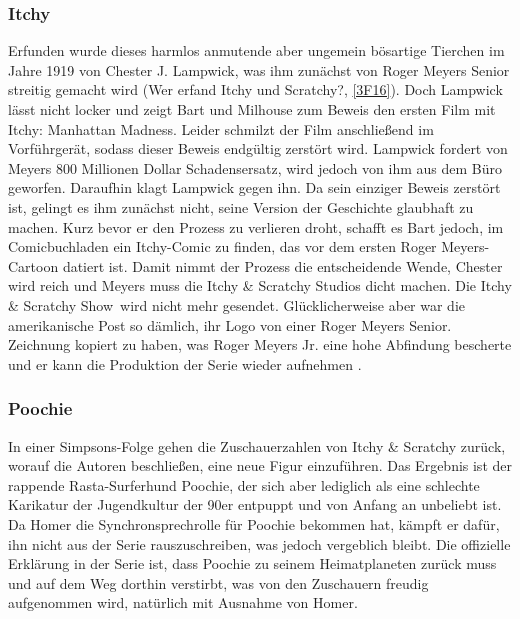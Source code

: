 \begin{appendix}
\subsubsection{Itchy}
Erfunden wurde dieses harmlos anmutende aber ungemein bösartige Tierchen im Jahre 1919 von Chester J. Lampwick, was ihm zunächst von Roger Meyers Senior streitig gemacht wird (\glqq Wer erfand Itchy und Scratchy?\grqq , \ref{3F16}). Doch Lampwick lässt nicht locker und zeigt Bart und Milhouse zum Beweis den ersten Film mit Itchy: \glqq Manhattan Madness\grqq . Leider schmilzt der Film anschließend im Vorführgerät, sodass dieser Beweis endgültig zerstört wird. Lampwick fordert von Meyers 800 Millionen Dollar Schadensersatz, wird jedoch von ihm aus dem Büro geworfen. Daraufhin klagt Lampwick gegen ihn. Da sein einziger Beweis zerstört ist, gelingt es ihm zunächst nicht, seine Version der Geschichte glaubhaft zu machen. Kurz bevor er den Prozess zu verlieren droht, schafft es Bart jedoch, im Comicbuchladen ein Itchy-Comic zu finden, das vor dem ersten Roger Meyers-Cartoon datiert ist. Damit nimmt der Prozess die entscheidende Wende, Chester wird reich und Meyers muss die Itchy \& Scratchy Studios dicht machen. Die \glqq Itchy \& Scratchy Show\grqq\ wird nicht mehr gesendet. Glücklicherweise aber war die amerikanische Post so dämlich, ihr Logo von einer Roger Meyers Senior. Zeichnung kopiert zu haben, was Roger Meyers Jr. eine hohe Abfindung bescherte und er kann die Produktion der Serie wieder aufnehmen \cite{itchy}. 


\subsubsection{Poochie}
In einer Simpsons-Folge gehen die Zuschauerzahlen von Itchy \& Scratchy zurück, worauf die Autoren beschließen, eine neue Figur einzuführen. Das Ergebnis ist der rappende Rasta-Surferhund Poochie, der sich aber lediglich als eine schlechte Karikatur der Jugendkultur der 90er entpuppt und von Anfang an unbeliebt ist. Da Homer die Synchronsprechrolle für Poochie bekommen hat, kämpft er dafür, ihn nicht aus der Serie rauszuschreiben, was jedoch vergeblich bleibt. Die offizielle Erklärung in der Serie ist, dass Poochie zu seinem Heimatplaneten zurück muss und auf dem Weg dorthin verstirbt, was von den Zuschauern freudig aufgenommen wird, natürlich mit Ausnahme von Homer.


\end{appendix}
